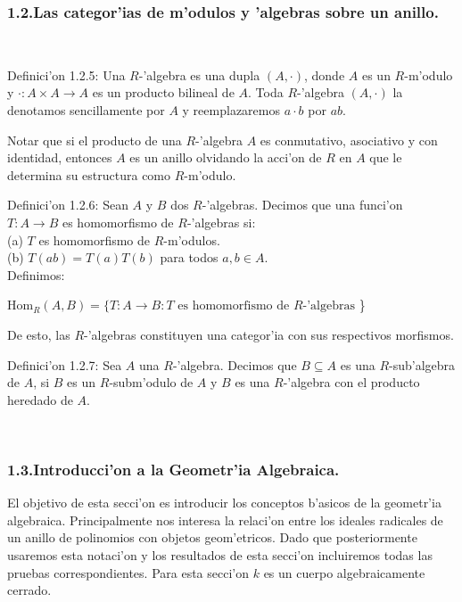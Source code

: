 \documentclass[10pt]{beamer}
\renewcommand{\ri}{\textit{R}}
\begin{document}
\begin{frame}
\frametitle{1.2.Las categor'ias de m'odulos y 'algebras sobre un anillo.}\\
\begin{block}{Definici'on 1.2.5:}
Una $\ri$-'algebra es una dupla $(A,\cdot)$, donde $A$ es un $\ri$-m'odulo y $\cdot:A \times A \rightarrow A$ es un producto bilineal de $A$. Toda $\ri$-'algebra $(A,\cdot)$ la denotamos sencillamente por $A$ y reemplazaremos $a \cdot b$ por $ab$.\\
\end{block}
Notar que si el producto de una $\ri$-'algebra $A$ es conmutativo, asociativo y con identidad, entonces $A$ es un anillo olvidando la acci'on de $R$ en $A$ que le determina su estructura como $R$-m'odulo.\\
\begin{block}{Definici'on 1.2.6:}
Sean $A$ y $B$ dos $\ri$-'algebras. Decimos que una funci'on $T:A\rightarrow B$ es homomorfismo de $\ri$-'algebras si:\\
(a) $T$ es homomorfismo de $\ri$-m'odulos.\\
(b) $T(ab)=T(a)T(b)$ para todos $a,b \in A$.\\
Definimos:
\begin{center}
$\text{Hom}_{\ri} (A,B)=\{ T:A \rightarrow B: T\text{ es homomorfismo de }R\text{-'algebras}$ \}\\
\end{center}
De esto, las $\ri$-'algebras constituyen una categor'ia con sus respectivos morfismos.\\
\end{block}
\begin{block}{Definici'on 1.2.7:}
Sea $A$ una $\ri$-'algebra. Decimos que $B\subseteq A$ es una $\ri$-sub'algebra de $A$, si $B$ es un $\ri$-subm'odulo de $A$ y $B$ es una $\ri$-'algebra con el producto heredado de $A$.\\
\end{block}
\end{frame}
\\
\begin{frame}
\frametitle{1.3.Introducci'on a la Geometr'ia Algebraica.}
El objetivo de esta secci'on es introducir los conceptos b'asicos de la geometr'ia algebraica. Principalmente nos interesa la relaci'on entre los ideales radicales de un anillo de polinomios con objetos geom'etricos. Dado que posteriormente usaremos esta notaci'on y los resultados de esta secci'on incluiremos todas las pruebas correspondientes. Para esta secci'on $k$ es un cuerpo algebraicamente cerrado.\\ 
\end{frame}
\end{document}
